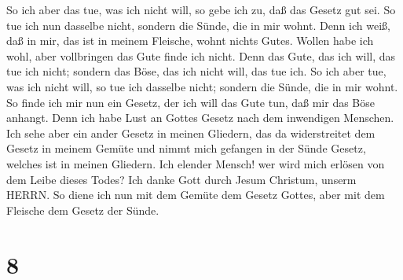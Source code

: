 So ich aber das tue, was ich nicht will, so gebe ich zu, daß das Gesetz
gut sei.  So tue ich nun dasselbe nicht, sondern die Sünde,
die in mir wohnt.  Denn ich weiß, daß in mir, das ist in
meinem Fleische, wohnt nichts Gutes. Wollen habe ich wohl, aber
vollbringen das Gute finde ich nicht.  Denn das Gute, das
ich will, das tue ich nicht; sondern das Böse, das ich nicht will, das
tue ich.  So ich aber tue, was ich nicht will, so tue ich
dasselbe nicht; sondern die Sünde, die in mir wohnt.  So
finde ich mir nun ein Gesetz, der ich will das Gute tun, daß mir das
Böse anhangt.  Denn ich habe Lust an Gottes Gesetz nach dem
inwendigen Menschen.  Ich sehe aber ein ander Gesetz in
meinen Gliedern, das da widerstreitet dem Gesetz in meinem Gemüte und
nimmt mich gefangen in der Sünde Gesetz, welches ist in meinen Gliedern.
 Ich elender Mensch! wer wird mich erlösen von dem Leibe
dieses Todes?  Ich danke Gott durch Jesum Christum, unserm
HERRN. So diene ich nun mit dem Gemüte dem Gesetz Gottes, aber mit dem
Fleische dem Gesetz der Sünde.

\hypertarget{section-7}{%
\section{8}\label{section-7}}

